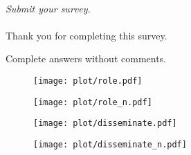 \documentclass[headsepline,titlepage,twoside,12pt,toc=flat,headings=normal]{scrreprt}
\begin{document}
\paragraph{}
\emph{Submit your survey.}

\paragraph{}
Thank you for completing this survey.


\clearpage
\begin{sidewaystable}
\caption{Complete answers without comments.}
\label{tab:results}
\tiny
\setlength{\tabcolsep}{2pt}

\end{sidewaystable}
\restoregeometry



\begin{figure}[h!]
\texttt{[image: plot/role.pdf]}
\caption{}
\label{fig:role}
\end{figure}

\begin{figure}[h!]
\texttt{[image: plot/role\_n.pdf]}
\caption{}
\label{fig:role_n}
\end{figure}


\begin{figure}[h!]
\texttt{[image: plot/disseminate.pdf]}
\caption{}
\label{fig:disseminate}
\end{figure}

\begin{figure}[h!]
\texttt{[image: plot/disseminate\_n.pdf]}
\caption{}
\label{fig:disseminate_n}
\end{figure}
\end{document}
